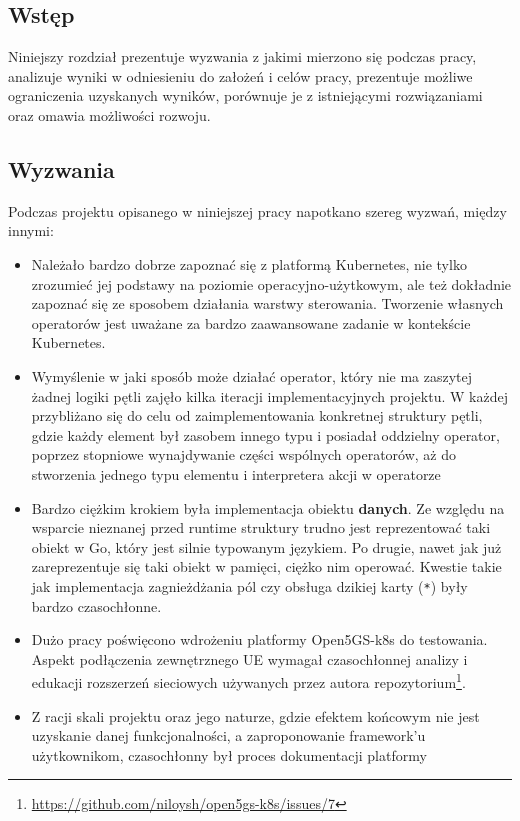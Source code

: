 \subsection{Wstęp}
Niniejszy rozdział prezentuje wyzwania z jakimi mierzono się podczas pracy, analizuje wyniki w odniesieniu do założeń i celów pracy, prezentuje możliwe ograniczenia uzyskanych wyników, porównuje je z istniejącymi rozwiązaniami oraz omawia możliwości rozwoju.

\subsection{Wyzwania}

Podczas projektu opisanego w niniejszej pracy napotkano szereg wyzwań, między innymi:
\begin{itemize}
    \item Należało bardzo dobrze zapoznać się z platformą Kubernetes, nie tylko zrozumieć jej podstawy na poziomie operacyjno-użytkowym, ale też dokładnie zapoznać się ze sposobem działania warstwy sterowania. Tworzenie własnych operatorów jest uważane za bardzo zaawansowane zadanie w kontekście Kubernetes.
    \item Wymyślenie w jaki sposób może działać operator, który nie ma zaszytej żadnej logiki pętli zajęło kilka iteracji implementacyjnych projektu. W każdej przybliżano się do celu od zaimplementowania konkretnej struktury pętli, gdzie każdy element był zasobem innego typu i posiadał oddzielny operator, poprzez stopniowe wynajdywanie części wspólnych operatorów, aż do stworzenia jednego typu elementu i interpretera akcji w operatorze
    \item Bardzo ciężkim krokiem była implementacja obiektu \textbf{danych}. Ze względu na wsparcie nieznanej przed runtime struktury trudno jest reprezentować taki obiekt w Go, który jest silnie typowanym językiem. Po drugie, nawet jak już zareprezentuje się taki obiekt w pamięci, ciężko nim operować. Kwestie takie jak implementacja zagnieżdżania pól czy obsługa dzikiej karty (\texttt{*}) były bardzo czasochłonne.
    \item Dużo pracy poświęcono wdrożeniu platformy Open5GS-k8s do testowania. Aspekt podłączenia zewnętrznego UE wymagał czasochłonnej analizy i edukacji rozszerzeń sieciowych używanych przez autora repozytorium\footnote{\url{https://github.com/niloysh/open5gs-k8s/issues/7}}.
    \item Z racji skali projektu oraz jego naturze, gdzie efektem końcowym nie jest uzyskanie danej funkcjonalności, a zaproponowanie framework'u użytkownikom, czasochłonny był proces dokumentacji platformy
\end{itemize}

